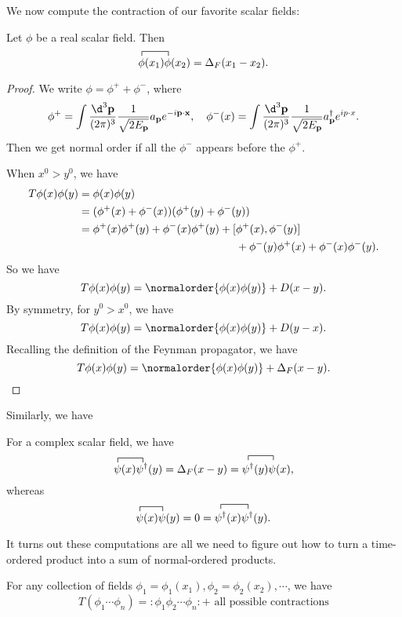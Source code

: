 \documentclass[a4paper]{article}
\begin{document}
We now compute the contraction of our favorite scalar fields:
\begin{prop}
  Let $\phi$ be a real scalar field. Then
  \[
    \contraction{}{\phi}{(x_1)}{\phi}\phi(x_1)\phi(x_2) = \Delta_F(x_1 - x_2).
  \]
\end{prop}

\begin{proof}
  We write $\phi = \phi^+ + \phi^-$, where
  \[
    \phi^+ = \int \frac{\d^3 \mathbf{p}}{(2\pi)^3} \frac{1}{\sqrt{2 E_\mathbf{p}}} a_\mathbf{p} e^{-i\mathbf{p}\cdot \mathbf{x}},\quad \phi^-(x) = \int \frac{\d^3 \mathbf{p}}{(2\pi)^3} \frac{1}{\sqrt{2 E_\mathbf{p}}} a_\mathbf{p}^\dagger e^{ip\cdot x}.
  \]
  Then we get normal order if all the $\phi^-$ appears before the $\phi^+$.

  When $x^0 > y^0$, we have
  \begin{align*}
    T\phi(x) \phi(y) ={}& \phi(x) \phi(y)\\
    ={}& (\phi^+(x) + \phi^-(x))(\phi^+(y) + \phi^-(y))\\
    ={}& \phi^+(x)\phi^+(y) + \phi^-(x) \phi^+(y) + [\phi^+(x), \phi^-(y)] \\
    &\hphantom{\phi^+(x)\phi^+(y) + \phi^-(x) \phi^+(y) + [}+ \phi^-(y) \phi^+(x) + \phi^-(x) \phi^-(y).
  \end{align*}
  So we have
  \[
    T\phi(x) \phi(y) = \normalorder{\phi(x) \phi(y)} + D(x - y).
  \]
  By symmetry, for $y^0 > x^0$, we have
  \[
    T\phi(x) \phi(y) = \normalorder{\phi(x)\phi(y)} + D(y - x).
  \]
  Recalling the definition of the Feynman propagator, we have
  \[
    T\phi(x)\phi(y) = \normalorder{\phi(x) \phi(y)} + \Delta_F(x - y).
  \]
\end{proof}

Similarly, we have
\begin{prop}
   For a complex scalar field, we have
  \[
    \contraction{}{\psi}{(x)}{\psi^\dagger}\psi(x) \psi^\dagger(y) = \Delta_F(x - y) = \contraction{}{\psi^\dagger}{(u)}{\psi}\psi^\dagger(y) \psi(x),
  \]
  whereas
  \[
    \contraction{}{\psi}{(x)}{\psi} \psi(x) \psi(y) = 0 =\contraction{}{\psi^\dagger}{(x)}{\psi^\dagger} \psi^\dagger(x) \psi^\dagger(y).
  \]
\end{prop}

It turns out these computations are all we need to figure out how to turn a time-ordered product into a sum of normal-ordered products.

\begin{thm}
  For any collection of fields $\phi_1 = \phi_1(x_1), \phi_2 = \phi_2(x_2), \cdots$, we have
  \[
    T(\phi_1 \cdots \phi_n) = :\phi_1 \phi_2 \cdots \phi_n: + \text{ all possible contractions}
  \]
\end{thm}
\end{document}
